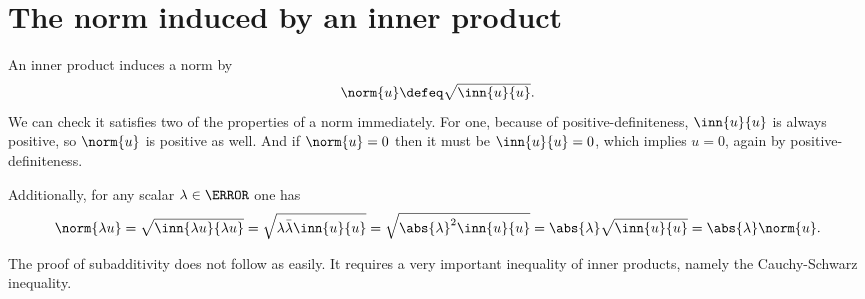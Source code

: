 \documentclass[12pt,oneside]{book}
\begin{document}
\section{The norm induced by an inner product}
An inner product induces a norm by
\begin{equation*}
	\norm{u} \defeq \sqrt{\inn{u}{u}}.
\end{equation*}
We can check it satisfies two of the properties of a norm immediately. For one, because of
positive-definiteness, \( \inn{u}{u} \) is always positive, so \( \norm{u} \) is positive
as well. And if \( \norm{u} = 0 \) then it must be \( \inn{u}{u} = 0 \), which implies \(
u = 0 \), again by positive-definiteness. 

Additionally, for any scalar \( \lambda \in \C \) one has
\begin{equation*}
	\norm{\lambda u} = \sqrt{\inn{\lambda u}{\lambda u}} = \sqrt{\lambda \bar{\lambda}
	\inn{u}{u}} = \sqrt{\abs{\lambda}^2 \inn{u}{u}} = \abs{\lambda} \sqrt{\inn{u}{u}} =
	\abs{\lambda} \norm{u}.
\end{equation*}

The proof of subadditivity does not follow as easily. It requires a very important
inequality of inner products, namely the Cauchy-Schwarz inequality.
\end{document}
